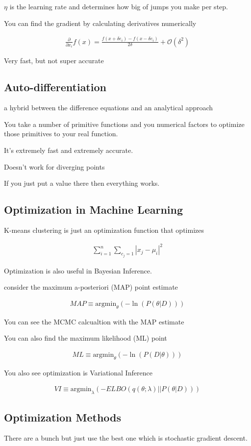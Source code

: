 \documentclass[fleqn]{report}
\newcommand{\del}{\partial}
\newcommand{\equations} [1] {
\begin{gather*}
#1
\end{gather*}
}
\begin{document}
$\eta$ is the learning rate and determines how big of jumps you make per step. 

You can find the gradient by calculating 
derivatives numerically 
\equations{
    \frac{\del}{\del x_i} f(x)
    =
    \frac{f(x + \delta e_i) - f(x - \delta e_i)}{2 \delta} + \mathcal O(\delta^2)
}

Very fast, but not super accurate 

\subsection{Auto-differentiation}
a hybrid between the difference equations and an analytical approach 

You take a number of primitive functions and you numerical 
factors to optimize those primitives to your real function. 

It's extremely fast and extremely accurate. 

Doesn't work for diverging points 

If you just put a value there then everything works. 

\subsection{Optimization in Machine Learning}
K-means clustering is just an optimization function that optimizes 
\equations{
    \sum^{n}_{i = 1}
    \sum_{c_j = 1}
    |x_j - \mu_i|^2
}

Optimization is also useful in Bayesian Inference. 

consider the maximum a-posteriori (MAP) point estimate 
\equations{
    MAP 
    \equiv 
    \textrm{argmin}_{\theta} ( - \ln(P(\theta | D)))
}

You can see the MCMC calcualtion with the MAP estimate 

You can also find the maximum likelihood (ML) point 
\equations{
    ML 
    \equiv 
    \textrm{argmin}_\theta (-\ln(P(D | \theta )))
}

You also see optimization is Variational Inference 
\equations{
    VI
    \equiv 
    \textrm{argmin}_{\lambda}
    (
        -ELBO(q(\theta; \lambda) || P(\theta | D))
    )
}

\subsection{Optimization Methods}
There are a bunch but just use the best one which is 
stochastic gradient descent. 
\end{document}
